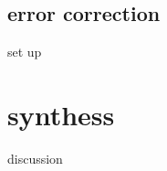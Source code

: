 \documentclass[18 pt]{beamer}
\begin{document}
\subsection{error correction}
\begin{frame}{set up}
\end{frame}
\section{synthess}
\begin{frame}{discussion}
\end{frame}
\end{document}

